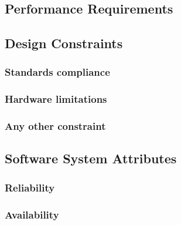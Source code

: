 \subsection{Performance Requirements}



\subsection{Design Constraints}

\subsubsection{Standards compliance}

\subsubsection{Hardware limitations}
\subsubsection{Any other constraint}


\subsection{Software System Attributes}

\subsubsection{Reliability}


\subsubsection{Availability}


